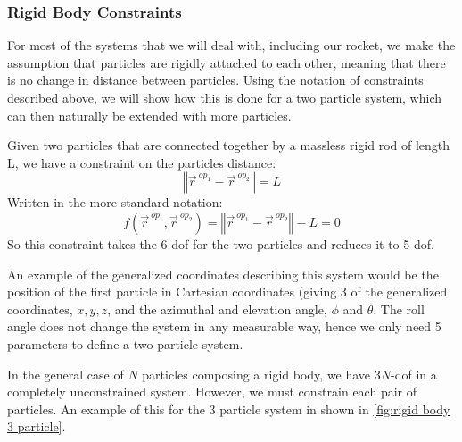 \subsubsection{Rigid Body Constraints}\label{sec: rigid body constraints}
For most of the systems that we will deal with, including our rocket, we make the assumption that particles are rigidly attached to each other, meaning that there is no change in distance between particles. Using the notation of constraints described above, we will show how this is done for a two particle system, which can then naturally be extended with more particles.

Given two particles that are connected together by a massless rigid rod of length L, we have a constraint on the particles distance:
$$\left\Vert \vec{r}^{\ op_1}-\vec{r}^{\ op_2}\right\Vert=L$$
Written in the more standard notation:
$$f\left(\vec{r}^{\ op_1},\vec{r}^{\ op_2}\right)=\left\Vert \vec{r}^{\ op_1}-\vec{r}^{\ op_2}\right\Vert-L=0$$
So this constraint takes the 6-\gls{dof} for the two particles and reduces it to 5-\gls{dof}.

An example of the generalized coordinates describing this system would be the position of the first particle in Cartesian coordinates (giving 3 of the generalized coordinates, $x,y,z$, and the azimuthal and elevation angle, $\phi$ and $\theta$. The roll angle does not change the system in any measurable way, hence we only need 5 parameters to define a two particle system.

In the general case of $N$ particles composing a \gls{rigid body}, we have $3N$-\gls{dof} in a completely unconstrained system. However, we must constrain each pair of particles. An example of this for the 3 particle system in shown in \autoref{fig:rigid body 3 particle}.

